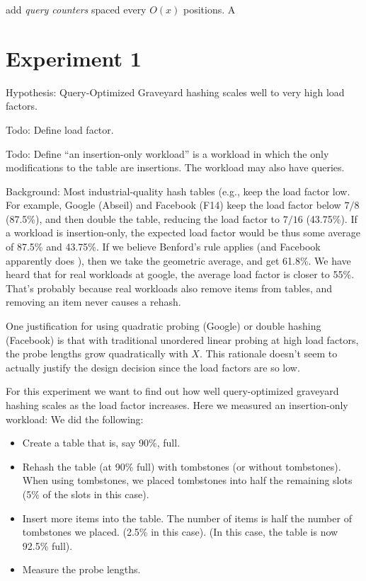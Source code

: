 \documentclass[10pt]{article}
\theoremstyle{remark}
\theoremstyle{remark}
\begin{document}
add \emph{query counters} spaced every $O(x)$ positions. A 


\section{Experiment 1}

Hypothesis: Query-Optimized Graveyard hashing scales well to very high
load factors.

Todo: Define load factor.

Todo: Define ``an insertion-only workload'' is a workload in which the
only modifications to the table are insertions.  The workload may also
have queries.

Background: Most industrial-quality hash tables (e.g., \cite{Abseil17,
  BronsonSh19} keep the load factor low.  For example, Google (Abseil)
and Facebook (F14) keep the load factor below $7/8$ (87.5\%), and then
double the table, reducing the load factor to $7/16$ (43.75\%).  If a
workload is insertion-only, the expected load factor would be thus
some average of 87.5\% and 43.75\%.  If we believe Benford's rule
\cite{Benford38} applies (and Facebook apparently does
\cite{BronsonSh19}), then we take the geometric average, and get
61.8\%.  We have heard that for real workloads at google, the average
load factor is closer to 55\%.  That's probably because real workloads
also remove items from tables, and removing an item never causes a
rehash.

One justification for using quadratic probing (Google) or double
hashing (Facebook) is that with traditional unordered linear probing
at high load factors, the probe lengths grow quadratically with $X$.
This rationale doesn't seem to actually justify the design decision
since the load factors are so low.

For this experiment we want to find out how well query-optimized
graveyard hashing scales as the load factor increases.  Here we
measured an insertion-only workload: We did the following:
\begin{itemize}
\item Create a table that is, say 90\%, full.
\item Rehash the table (at 90\% full) with tombstones (or without
  tombstones).  When using tombstones, we placed tombstones into half
  the remaining slots (5\% of the slots in this case).
\item Insert more items into the table.  The number of items is half
  the number of tombstones we placed.  (2.5\% in this case).  (In this
  case, the table is now 92.5\% full).
\item Measure the probe lengths.
\end{itemize}
\end{document}
